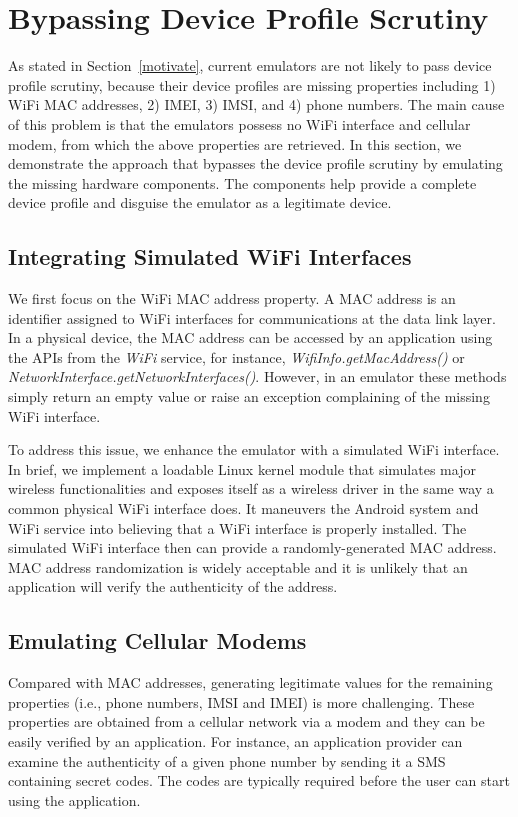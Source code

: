 \documentclass[conference]{IEEEtranl}
\begin{document}
	\section{Bypassing Device Profile Scrutiny}\label{deviceid}

	As stated in Section~\ref{motivate},
	current emulators are not likely to pass device profile scrutiny, because their device profiles are missing properties including 1) WiFi MAC addresses, 2) IMEI, 3) IMSI, and 4) phone numbers. The main cause of this problem is that the emulators possess no WiFi interface and cellular modem, from which the above properties are retrieved.
	In this section, we demonstrate the approach that bypasses the device profile scrutiny by emulating the missing hardware components. The components help provide a complete device profile and disguise the emulator as a legitimate device. 

	\subsection{Integrating Simulated WiFi Interfaces}
	We first focus on the WiFi MAC address property. A MAC address is an identifier assigned to WiFi interfaces for communications at the data link layer. In a physical device, the MAC address can be accessed by an application using the APIs from the \textit{WiFi} service, for instance, \textit{WifiInfo.getMacAddress()} or \textit{NetworkInterface.getNetworkInterfaces()}. However, in an emulator these methods simply return an empty value or raise an exception complaining of the missing WiFi interface.

	To address this issue, we enhance the emulator with a simulated WiFi interface.
	In brief, we implement a loadable Linux kernel module that simulates major wireless functionalities and exposes itself as a wireless driver in the same way a common physical WiFi interface does. It maneuvers the Android system and WiFi service into believing that a WiFi interface is properly installed. The simulated WiFi interface then can provide a randomly-generated MAC address. MAC address randomization is widely acceptable \cite{vanhoef2016mac} and it is unlikely that an application will verify the authenticity of the address.

	\subsection{Emulating Cellular Modems} 
	Compared with MAC addresses, generating legitimate values for the remaining properties (i.e., phone numbers, IMSI and IMEI) is more challenging. These properties are obtained from a cellular network via a modem and they can be easily verified by an application. For instance, an application provider can examine the authenticity of a given phone number by sending it a SMS containing secret codes. The codes are typically required before the user can start using the application. 
\end{document}
